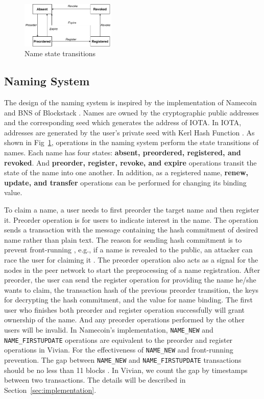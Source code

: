 \begin{figure}[h]
    \centering
    \includegraphics[width=0.4\textwidth,trim={0 0 0 0},clip]{figs/name_state_transition.pdf}
    \caption{Name state transitions}
    \label{fig:name_state_transition}
\end{figure}

\subsection{Naming System}
The design of the naming system is inspired by the implementation of Namecoin \cite{kalodner2015empirical} and BNS of Blockstack \cite{ali2017blockstack, ali2016blockstack}.
Names are owned by the cryptographic public addresses and the corresponding seed which generates the address of IOTA. In IOTA, addresses are generated by the user's private seed with Kerl Hash Function \cite{Baek2019IOTAAC}. As shown in Fig~\ref{fig:name_state_transition}, operations in the naming system perform the state transitions of names.
Each name has four states: \textbf{absent, preordered, registered, and revoked}. And \textbf{preorder, register, revoke, and expire} operations transit the state of the name into one another. In addition, as a registered name, \textbf{renew, update, and transfer} operations can be performed for changing its binding value.

To claim a name, a user needs to first preorder the target name and then register it. Preorder operation is for users to indicate interest in the name. The operation sends a transaction with the message containing the hash commitment of desired name rather than plain text. The reason for sending hash commitment is to prevent front-running \cite{kalodner2015empirical}, e.g., if a name is revealed to the public, an attacker can race the user for claiming it \cite{ali2016blockstack}.
The preorder operation also acts as a signal for the nodes in the peer network to start the preprocessing of a name registration.
After preorder, the user can send the register operation for providing the name he/she wants to claim, the transaction hash of the previous preorder transition, the keys for decrypting the hash commitment, and the value for name binding.
The first user who finishes both preorder and register operation successfully will grant ownership of the name.
And any preorder operations performed by the other users will be invalid. In Namecoin's implementation, \texttt{NAME\_NEW} and \texttt{NAME\_FIRSTUPDATE} operations are equivalent to the preorder and register operations in Vivian.
For the effectiveness of \texttt{NAME\_NEW} and front-running prevention. The gap between \texttt{NAME\_NEW} and \texttt{NAME\_FIRSTUPDATE} transactions should be no less than 11 blocks \cite{kalodner2015empirical}. In Vivian, we count the gap by timestamps between two transactions. The details will be described in Section~\ref{sec:implementation}.

